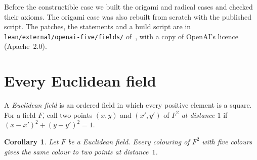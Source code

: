 \documentclass[11pt,a4paper]{amsart}
\newtheorem{corollary}[theorem]{Corollary}
\theoremstyle{remark}
\begin{document}
Before the constructible case we built the origami and radical cases and checked their axioms. The origami case was
also rebuilt from scratch with the published script. The patches, the statements and a build script are in
\nolinkurl{lean/external/openai-five/fields/} of~\cite{Repo}, with a copy of OpenAI's licence (Apache~2.0).

\section{Every Euclidean field}\label{sec:euclid}

A \emph{Euclidean field} is an ordered field in which every positive element is a square. For a field $F$, call two
points $(x,y)$ and $(x',y')$ of $F^2$ \emph{at distance $1$} if $(x-x')^2+(y-y')^2=1$.

\begin{corollary}\label{cor:euclid}
Let $F$ be a Euclidean field. Every colouring of $F^2$ with five colours gives the same colour to two points at
distance~$1$.
\end{corollary}
\end{document}
